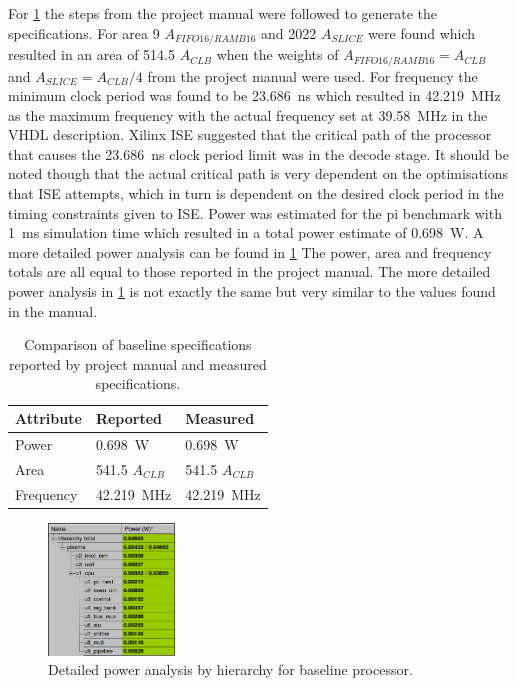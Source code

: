 \documentclass[final]{article}
\begin{document}
For \cref{tab:baselineperformance} the steps from the project manual were followed to generate the specifications.
For area 9 $A_{FIFO16/RAMB16}$ and 2022 $A_{SLICE}$ were found which resulted in an area of 514.5 $A_{CLB}$ when the weights of $A_{FIFO16/RAMB16} = A_{CLB}$ and $A_{SLICE} = A_{CLB}/4$ from the project manual were used.
For frequency the minimum clock period was found to be \SI{23.686}{\nano\second} which resulted in \SI{42.219}{\mega\hertz} as the maximum frequency with the actual frequency set at \SI{39.58}{\mega\hertz} in the VHDL description.
Xilinx ISE suggested that the critical path of the processor that causes the \SI{23.686}{\nano\second} clock period limit was in the decode stage. 
It should be noted though that the actual critical path is very dependent on the optimisations that ISE attempts, which in turn is dependent on the desired clock period in the timing constraints given to ISE.
Power was estimated for the pi benchmark with \SI{1}{\milli\second} simulation time which resulted in a total power estimate of \SI{0.698}{\watt}.
A more detailed power analysis can be found in \cref{fig:baselinepower}
The power, area and frequency totals are all equal to those reported in the project manual.
The more detailed power analysis in \cref{fig:baselinepower} is not exactly the same but very similar to the values found in the manual.


\begin{table}[H]
    \centering
    \caption{Comparison of baseline specifications reported by project manual and measured specifications.}
    \label{tab:baselineperformance}
    \begin{tabular}{lll}
        \toprule
        \textbf{Attribute} & \textbf{Reported} & \textbf{Measured}      \\
        \midrule
        Power    &  \SI{0.698}{\watt}        & \SI{0.698}{\watt}        \\
        Area     &  \num{541.5} $A_{CLB}$    & \num{541.5} $A_{CLB}$    \\
        Frequency&  \SI{42.219}{\mega\hertz} & \SI{42.219}{\mega\hertz} \\
        \bottomrule
    \end{tabular}

\end{table}

\begin{figure}[H]
\centering
\includegraphics[width=0.3\textwidth]{resources/baselinepower.png}
\caption{Detailed power analysis by hierarchy for baseline processor.}
\label{fig:baselinepower}
\end{figure}
\end{document}
